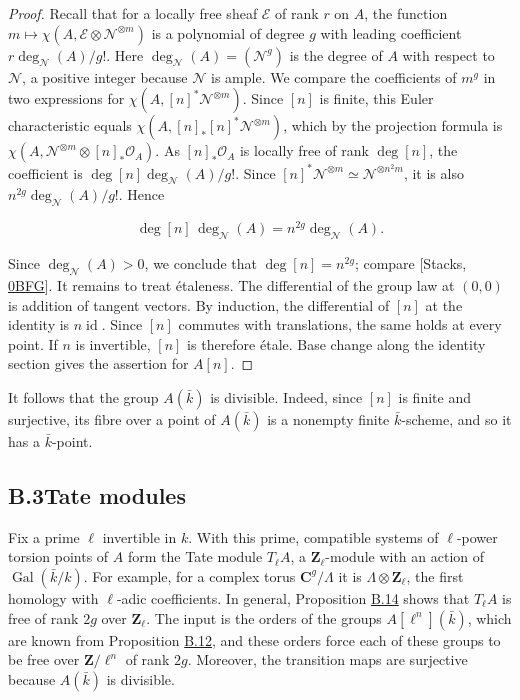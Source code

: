 \documentclass[11pt]{article}
\begin{document}
\begin{proof}[{Proof}]
Recall that for a locally free sheaf \(\mathcal E\) of rank \(r\) on \(A\), the function \(m\mapsto\chi(A,\mathcal E\otimes\mathcal N^{\otimes m})\) is a polynomial of degree \(g\) with leading coefficient \(r\deg_{\mathcal N}(A)/g!\). Here \(\deg_{\mathcal N}(A)=(\mathcal N^g)\) is the degree of \(A\) with respect to \(\mathcal N\), a positive integer because \(\mathcal N\) is ample. We compare the coefficients of \(m^g\) in two expressions for \(\chi(A,[n]^*\mathcal N^{\otimes m})\). Since \([n]\) is finite, this Euler characteristic equals \(\chi(A,[n]_*[n]^*\mathcal N^{\otimes m})\), which by the projection formula is \(\chi(A,\mathcal N^{\otimes m}\otimes[n]_*\mathcal O_A)\). As \([n]_*\mathcal O_A\) is locally free of rank \(\deg[n]\), the coefficient is \(\deg[n]\deg_{\mathcal N}(A)/g!\). Since \([n]^*\mathcal N^{\otimes m}\simeq\mathcal N^{\otimes n^2m}\), it is also \(n^{2g}\deg_{\mathcal N}(A)/g!\). Hence

\[
\deg[n]\,\deg_{\mathcal N}(A)
=n^{2g}\deg_{\mathcal N}(A).
\]

Since \(\deg_{\mathcal N}(A)>0\), we conclude that \(\deg[n]=n^{2g}\); compare [Stacks, \href{https://stacks.math.columbia.edu/tag/0BFG}{0BFG}]. It remains to treat étaleness. The differential of the group law at \((0,0)\) is addition of tangent vectors. By induction, the differential of \([n]\) at the identity is \(n\operatorname{id}\). Since \([n]\) commutes with translations, the same holds at every point. If \(n\) is invertible, \([n]\) is therefore étale. Base change along the identity section gives the assertion for \(A[n]\).
\end{proof}

\label{bp110}%
It follows that the group \(A(\bar k)\) is divisible. Indeed, since \([n]\) is finite and surjective, its fibre over a point of \(A(\bar k)\) is a nonempty finite \(\bar k\)-scheme, and so it has a \(\bar k\)-point.


\subsection*{\texorpdfstring{B.3\quad Tate modules}{B.3 Tate modules}}
\label{bp111}%
\label{bp112}%
Fix a prime \(\ell\) invertible in \(k\). With this prime, compatible systems of \(\ell\)-power torsion points of \(A\) form the Tate module \(T_\ell A\), a \(\mathbf Z_\ell\)-module with an action of \(\operatorname{Gal}(\bar k/k)\). For example, for a complex torus \(\mathbf C^g/\Lambda\) it is \(\Lambda\otimes\mathbf Z_\ell\), the first homology with \(\ell\)-adic coefficients. In general, Proposition \hyperref[bp114]{B.14} shows that \(T_\ell A\) is free of rank \(2g\) over \(\mathbf Z_\ell\). The input is the orders of the groups \(A[\ell^n](\bar k)\), which are known from Proposition \hyperref[bp108]{B.12}, and these orders force each of these groups to be free over \(\mathbf Z/\ell^n\) of rank \(2g\). Moreover, the transition maps are surjective because \(A(\bar k)\) is divisible.
\end{document}
